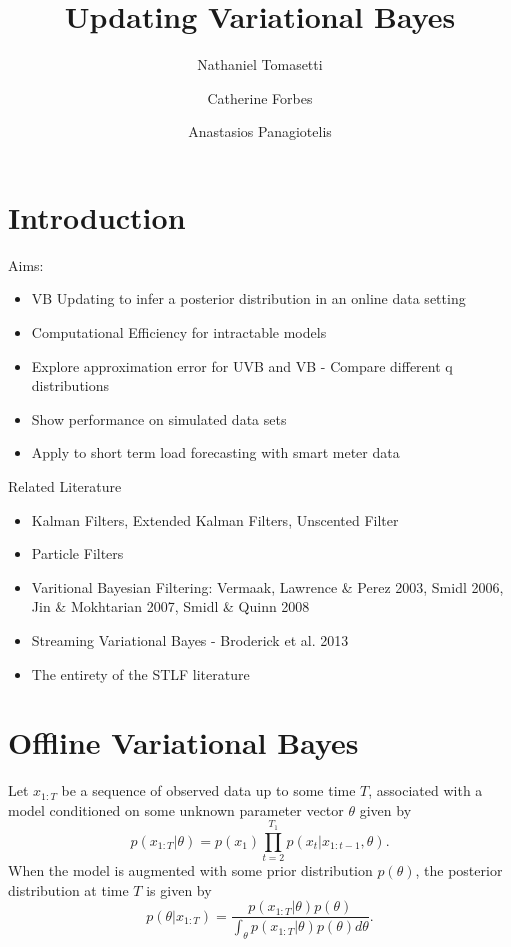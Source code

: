 \documentclass[12pt,a4paper]{article}\usepackage[]{graphicx}\usepackage[]{color}
\title{Updating Variational Bayes}
\author{Nathaniel Tomasetti 
\and Catherine Forbes
\and Anastasios Panagiotelis}
\begin{document}
\maketitle



\section{Introduction}
\label{sec:intro}

Aims:
\begin{itemize}
\item VB Updating to infer a posterior distribution in an online data setting
\item Computational Efficiency for intractable models
\item Explore approximation error for UVB and VB - Compare different q distributions
\item Show performance on simulated data sets
\item Apply to short term load forecasting with smart meter data
\end{itemize}

Related Literature
\begin{itemize}
\item Kalman Filters, Extended Kalman Filters, Unscented Filter
\item Particle Filters
\item Varitional Bayesian Filtering: Vermaak, Lawrence \& Perez 2003, Smidl 2006, Jin \& Mokhtarian 2007, Smidl \& Quinn 2008
\item Streaming Variational Bayes - Broderick et al. 2013
\item The entirety of the STLF literature
\end{itemize}

\section{Offline Variational Bayes}
\label{sec:Inference}

Let $x_{1:T}$ be a sequence of observed data up to some time $T$, associated with a model conditioned on some unknown parameter vector $\theta$ given by
\begin{equation}
\label{likelihood}
p(x_{1:T} | \theta) = p(x_1) \prod_{t=2}^{T_1} p(x_t | x_{1:t-1}, \theta).
\end{equation}
When the model is augmented with some prior distribution $p(\theta)$, the posterior distribution at time $T$ is given by
\begin{equation}
\label{posterior}
p(\theta | x_{1:T}) = \frac{p(x_{1:T} | \theta)p(\theta)}{\int_{\theta}p(x_{1:T} | \theta)p(\theta)d\theta}.
\end{equation}
\\
\end{document}
